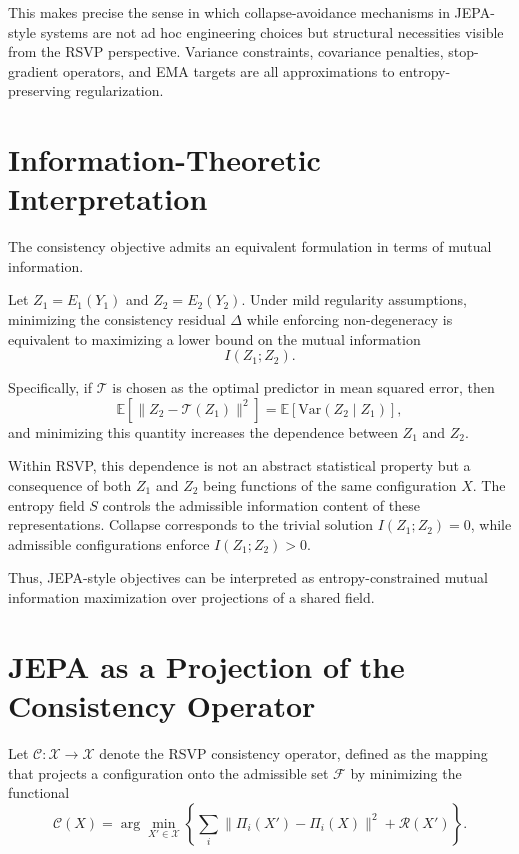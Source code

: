 \documentclass[12pt, oneside]{article}
\begin{document}
This makes precise the sense in which collapse-avoidance mechanisms in JEPA-style systems are not ad hoc engineering choices but structural necessities visible from the RSVP perspective. Variance constraints, covariance penalties, stop-gradient operators, and EMA targets are all approximations to entropy-preserving regularization.

\section{Information-Theoretic Interpretation}
\label{sec:interpretation}

The consistency objective admits an equivalent formulation in terms of mutual information.

Let $Z_1 = E_1(Y_1)$ and $Z_2 = E_2(Y_2)$. Under mild regularity assumptions, minimizing the consistency residual $\Delta$ while enforcing non-degeneracy is equivalent to maximizing a lower bound on the mutual information
\[
I(Z_1; Z_2).
\]

Specifically, if $\mathcal{T}$ is chosen as the optimal predictor in mean squared error, then
\[
\mathbb{E}\left[\|Z_2 - \mathcal{T}(Z_1)\|^2\right]
= \mathbb{E}[\mathrm{Var}(Z_2 \mid Z_1)],
\]
and minimizing this quantity increases the dependence between $Z_1$ and $Z_2$.

Within RSVP, this dependence is not an abstract statistical property but a consequence of both $Z_1$ and $Z_2$ being functions of the same configuration $X$. The entropy field $S$ controls the admissible information content of these representations. Collapse corresponds to the trivial solution $I(Z_1;Z_2)=0$, while admissible configurations enforce $I(Z_1;Z_2)>0$.

Thus, JEPA-style objectives can be interpreted as entropy-constrained mutual information maximization over projections of a shared field.

\section{JEPA as a Projection of the Consistency Operator}
\label{sec:consistency}

Let $\mathcal{C} : \mathcal{X} \to \mathcal{X}$ denote the RSVP consistency operator, defined as the mapping that projects a configuration onto the admissible set $\mathcal{F}$ by minimizing the functional
\[
\mathcal{C}(X) = \arg\min_{X' \in \mathcal{X}} \left\{ \sum_i \|\Pi_i(X') - \Pi_i(X)\|^2 + \mathcal{R}(X') \right\}.
\]
\end{document}
